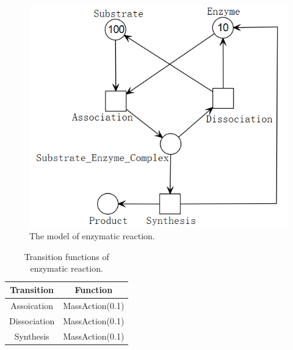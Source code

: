 \documentclass[journal,a4paper,onecolumn]{article}
\begin{document}
\begin{figure}[!hbt]
	\begin{center}
		\includegraphics[width=\columnwidth]{fig25}
		\caption{The model of enzymatic reaction.}
		\label{fig:The model of enzyme}
	\end{center}
\end{figure}

\begin{table}[!hbt]
	\begin{center}
		\caption{Transition functions of enzymatic reaction.}
		\label{Transition functions of enzyme}
		\begin{tabular}{|c|c|}
			\hline
			Transition&Function\\
			\hline
			Assoication&MassAction(0.1)\\
			\hline
			Dissociation&MassAction(0.1)\\
			\hline
			Synthesis&MassAction(0.1)\\
			\hline
		\end{tabular}
	\end{center}
\end{table}
\end{document}
